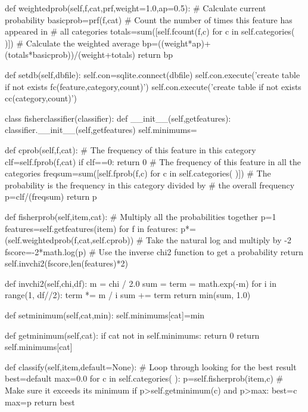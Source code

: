 \documentclass[12pt, letterpaper]{article}
\begin{document}
\begin{MyPython}[caption= Fisher Method, label=lst:fishermethod]
    def weightedprob(self,f,cat,prf,weight=1.0,ap=0.5):
        # Calculate current probability
        basicprob=prf(f,cat)
        # Count the number of times this feature has appeared in
        # all categories
        totals=sum([self.fcount(f,c) for c in self.categories( )])
        # Calculate the weighted average
        bp=((weight*ap)+(totals*basicprob))/(weight+totals)
        return bp

    def setdb(self,dbfile):
        self.con=sqlite.connect(dbfile)
        self.con.execute('create table if not exists fc(feature,category,count)')
        self.con.execute('create table if not exists cc(category,count)')




    

class fisherclassifier(classifier):
    def __init__(self,getfeatures):
        classifier.__init__(self,getfeatures)
        self.minimums={}
    
    def cprob(self,f,cat):
        # The frequency of this feature in this category
        clf=self.fprob(f,cat)
        if clf==0:
            return 0
        # The frequency of this feature in all the categories
        freqsum=sum([self.fprob(f,c) for c in self.categories( )])
        # The probability is the frequency in this category divided by
        # the overall frequency
        p=clf/(freqsum)
        return p

    def fisherprob(self,item,cat):
        # Multiply all the probabilities together
        p=1
        features=self.getfeatures(item)
        for f in features:
            p*=(self.weightedprob(f,cat,self.cprob))
            # Take the natural log and multiply by -2
            fscore=-2*math.log(p)
        # Use the inverse chi2 function to get a probability
        return self.invchi2(fscore,len(features)*2)

    def invchi2(self,chi,df):
        m = chi / 2.0
        sum = term = math.exp(-m)
        for i in range(1, df//2):
            term *= m / i
            sum += term
        return min(sum, 1.0)

    def setminimum(self,cat,min):
        self.minimums[cat]=min

    def getminimum(self,cat):
        if cat not in self.minimums:
            return 0
        return self.minimums[cat]

    def classify(self,item,default=None):
        # Loop through looking for the best result
        best=default
        max=0.0
        for c in self.categories( ):
            p=self.fisherprob(item,c)
            # Make sure it exceeds its minimum
            if p>self.getminimum(c) and p>max:
                best=c
                max=p
        return best
\end{MyPython}
\end{document}
